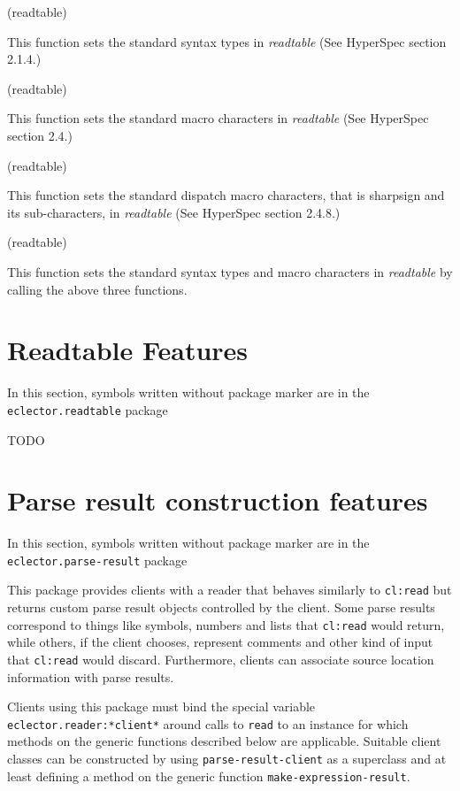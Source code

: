  (readtable)

This function sets the standard syntax types in \textit{readtable}
(See HyperSpec section 2.1.4.)

 (readtable)

This function sets the standard macro characters in \textit{readtable}
(See HyperSpec section 2.4.)

 (readtable)

This function sets the standard dispatch macro characters, that is
sharpsign and its sub-characters, in \textit{readtable} (See HyperSpec
section 2.4.8.)

 (readtable)

This function sets the standard syntax types and macro characters in
\textit{readtable} by calling the above three functions.

\section{Readtable Features}
\label{sec:readtable-features}

In this section, symbols written without package marker are in the
\texttt{eclector.readtable} package

TODO

\section{Parse result construction features}
\label{sec:parse-result-construction-features}

In this section, symbols written without package marker are in the
\texttt{eclector.parse-result} package

This package provides clients with a reader that behaves similarly to
\texttt{cl:read} but returns custom parse result objects controlled by
the client.  Some parse results correspond to things like symbols,
numbers and lists that \texttt{cl:read} would return, while others, if
the client chooses, represent comments and other kind of input that
\texttt{cl:read} would discard.  Furthermore, clients can associate
source location information with parse results.

Clients using this package must bind the special variable
\texttt{eclector.reader:*client*} around calls to \texttt{read} to an
instance for which methods on the generic functions described below
are applicable.  Suitable client classes can be constructed by using
\texttt{parse-result-client} as a superclass and at least defining a
method on the generic function \texttt{make-expression-result}.

